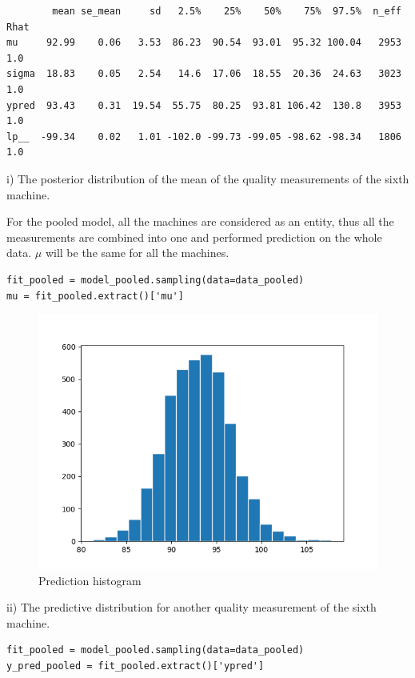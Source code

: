 \documentclass{article}
\begin{document}
\begin{verbatim}  
        mean se_mean     sd   2.5%    25%    50%    75%  97.5%  n_eff   Rhat
mu     92.99    0.06   3.53  86.23  90.54  93.01  95.32 100.04   2953    1.0
sigma  18.83    0.05   2.54   14.6  17.06  18.55  20.36  24.63   3023    1.0
ypred  93.43    0.31  19.54  55.75  80.25  93.81 106.42  130.8   3953    1.0
lp__  -99.34    0.02   1.01 -102.0 -99.73 -99.05 -98.62 -98.34   1806    1.0
\end{verbatim}

i) The posterior distribution of the mean of the quality measurements of the sixth machine.

For the pooled model, all the machines are considered as an entity, thus all the measurements are combined into one and performed prediction on the whole data. $\mu$ will be the same for all the machines.

\begin{verbatim}  
fit_pooled = model_pooled.sampling(data=data_pooled)
mu = fit_pooled.extract()['mu']
\end{verbatim}

\begin{figure}[H]
\centering  
\includegraphics[scale=0.5]{pooled_hist_mu.png}
\caption{Prediction histogram}
\label{fig: label}
\end{figure}

ii) The predictive distribution for another quality measurement of the sixth machine.

\begin{verbatim}  
fit_pooled = model_pooled.sampling(data=data_pooled)
y_pred_pooled = fit_pooled.extract()['ypred']
\end{verbatim}
\end{document}
